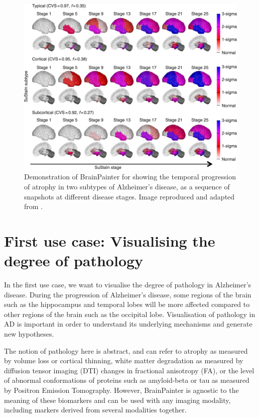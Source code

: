 \documentclass{llncs}
\begin{document}
\begin{figure}[htp]
\centering
 \includegraphics[width=1\textwidth, trim=20 0 0 220, clip]{images/young_progression.png}
 \caption{Demonstration of BrainPainter for showing the temporal progression of atrophy in two subtypes of Alzheimer's disease, as a sequence of snapshots at different disease stages. Image reproduced and adapted from \cite{young2018uncovering}.}
  \label{fig:youngProg}
\end{figure}

\section{First use case: Visualising the degree of pathology}
\label{degree}

In the first use case, we want to visualise the degree of pathology in Alzheimer's disease. During the progression of Alzheimer's disease, some regions of the brain such as the hippocampus and temporal lobes will be more affected compared to other regions of the brain such as the occipital lobe. Visualisation of pathology in AD is important in order to understand its underlying mechanisms and generate new hypotheses. 

The notion of pathology here is abstract, and can refer to atrophy as measured by volume loss or cortical thinning, white matter degradation as measured by diffusion tensor imaging (DTI) changes in fractional anisotropy (FA), or the level of abnormal conformations of proteins such as amyloid-beta or tau as measured by Positron Emission Tomography. However, BrainPainter is agnostic to the meaning of these biomarkers and can be used with any imaging modality, including markers derived from several modalities together. 
\end{document}
